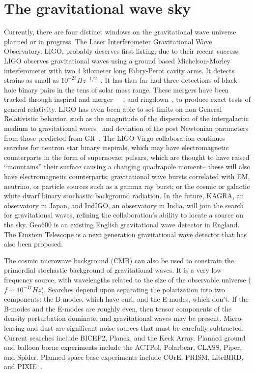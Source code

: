 \section{The gravitational wave sky}
Currently, there are four distinct windows on the gravitational wave universe planned or in progress. The Laser Interferometer Gravitational Wave Observatory, LIGO, probably deserves first listing, due to their recent success. LIGO observes gravitational waves using a ground based Michelson-Morley interferometer with two 4 kilometer long Fabry-Perot cavity arms. It detects strains as small as $10^{-23} Hz^{-1/2}$~\cite{LIGOsensitivity}. It has thus-far had three detections of black hole binary pairs in the tens of solar mass range. These mergers have been tracked through inspiral and merger~\cite{GW150914}~\cite{GW151226}~\cite{GW170104}, and ringdown~\cite{LIGO1e}, to produce exact tests of general relativity. LIGO has even been able to set limits on non-General Relativistic behavior, such as the magnitude of the dispersion of the intergalactic medium to gravitational waves~\cite{GW170104} and deviation of the post Newtonian parameters from those predicted from GR~\cite{LIGO1e}. The LIGO-Virgo collaboration continues searches for neutron star binary inspirals, which may have electromagnetic counterparts in the form of supernovae; pulsars, which are thought to have raised ``mountains'' their surface causing a changing quadrapole moment-- these will also have electromagnetic counterparts; gravitational wave bursts correlated with EM, neutrino, or particle sources such as a gamma ray burst; or the cosmic or galactic white dwarf binary stochastic background radiation. In the future, KAGRA, an observatory in Japan, and IndIGO, an observatory in India, will join the search for gravitational waves, refining the collaboration's ability to locate a source on the sky. Geo600 is an existing English gravitational wave detector in England. The Einstein Telescope is a next generation gravitational wave detector that has also been proposed. 


The cosmic microwave background (CMB) can also be used to constrain the primordial stochastic background of gravitational waves. It is a very low frequency source, with wavelengths related to the size of the observable universe ($f\sim 10^{-17} Hz$). Searches depend upon separating the polarization into two components: the B-modes, which have curl, and the E-modes, which don't. If the B-modes and the E-modes are roughly even, then tensor components of the density perturbation dominate, and gravitational waves may be present. Micro-lensing and dust are significant noise sources that must be carefully subtracted. Current searches include BICEP2, Planck, and the Keck Array. Planned ground and balloon borne experiments include the ACTPol, Polarbear, CLASS, Piper, and Spider. Planned space-base experiments include COrE, PRISM, LiteBIRD, and PIXIE~\cite{bmodes}. 



